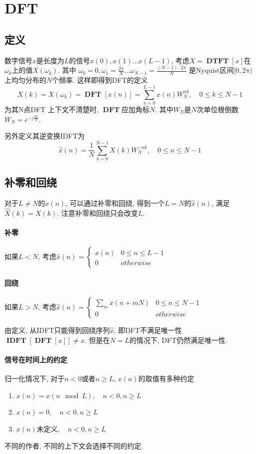 \documentclass{ctexart}
\DeclareMathOperator{\DTFT}{\mathbf{DTFT}}
\DeclareMathOperator{\DFT}{\mathbf{DFT}}
\DeclareMathOperator{\IDFT}{\mathbf{IDFT}}
\begin{document}
\section{DFT}
\subsection{定义}
    数字信号$x$是长度为$L$的信号$x(0), x(1) \ldots x(L - 1)$,
    考虑$X = \DTFT[x]$在$\omega_k$上的值$X(\omega_k)$. 其中
    $\omega_0 = 0, \omega_1 = \frac{2\pi}{N} \ldots \omega_{N - 1} = \frac{(N-1) \cdot 2\pi}{N}$
    是Nyquist区间$[0, 2\pi)$上均匀分布的$N$个频率. 这样即得到DFT的定义
    \[
        X(k) = X(\omega_k) = \DFT[x(n)] = \sum_{n = 0}^{L - 1} x(n) W_N^{nk},\quad 0 \le k \le N - 1\]
    为其N点DFT
    上下文不清楚时, $\DFT$应加角标$N$. 其中$W_N$是$N$次单位根倒数$W_N = e^{- j \frac{2 \pi}{N}}$.\par
    另外定义其逆变换IDFT为\[
        \hat{x}(n) = \frac{1}{N} \sum_{k = 0}^{N - 1} X(k) W_N^{-nk},\quad 0 \le n  \le N -1 \]

\subsection{补零和回绕} 对于$L \neq N$的$x(n)$, 可以通过补零和回绕, 得到一个$L = N$的$\hat{x}(n)$, 满足$\hat{X}(k) = X(k)$.
    注意补零和回绕只会改变$L$.
\paragraph{补零} 如果$L < N$, 考虑$\hat{x}(n) = \begin{cases} x(n) & 0 \le n \le L - 1\\ 0 & otherwise \end{cases}$
\paragraph{回绕} 如果$L > N$, 考虑$\hat{x}(n) = \begin{cases} \sum_m x(n + mN) & 0 \le n \le N - 1 \\ 0 & otherwise \end{cases}$\par
    由定义, 从IDFT只能得到回绕序列$\hat{x}$, 即DFT不满足唯一性 $\IDFT[\DFT [x]] \neq x$. 但是在$N = L$的情况下, DFT仍然满足唯一性.
\paragraph{信号在时间上的约定}
    归一化情况下, 对于$n < 0$或者$n \ge L$, $x(n)$的取值有多种约定 \begin{enumerate}
        \item $x(n) = x(n \mod L),\quad n < 0, n \ge L$
        \item $x(n) = 0,\quad n < 0, n \ge L$
        \item $x(n)$未定义$,\quad n < 0, n \ge L$
    \end{enumerate}
    不同的作者, 不同的上下文会选择不同的约定.
\end{document}

